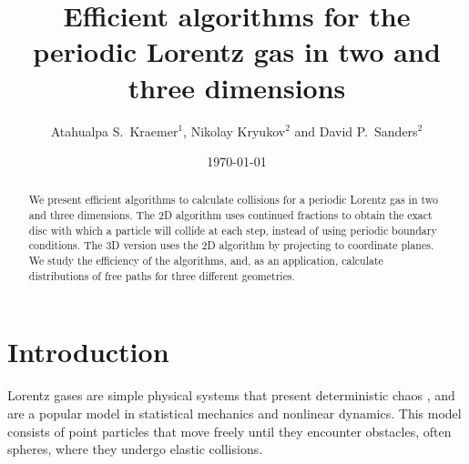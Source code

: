 \documentclass{iopart}
\begin{document}
\title{Efficient algorithms for the periodic Lorentz gas in two and three dimensions}

\author{Atahualpa S.~Kraemer$^{1}$, Nikolay Kryukov$^{2}$ and David P.~Sanders$^{2}$}

\address{$^{1}$ Institut für Theoretische Physik II - Soft Matter
Heinrich-Heine-Universität Düsseldorf
Building 25.32
Room O2.56
Universitätsstrasse 1
D-40225 Düsseldorf, Germany\\
$^{2}$Departamento de F\'isica, Facultad de Ciencias, Universidad Nacional
Aut\'onoma de M\'exico,
Ciudad Universitaria, M\'exico D.F.\ 04510, Mexico
}

 \date{\today}


\begin{abstract}

We present efficient algorithms to calculate collisions for a periodic Lorentz gas in two and three dimensions. The 2D algorithm uses continued fractions to obtain the exact disc with which a particle will collide at each step, instead of using periodic boundary conditions. The 3D version uses the 2D algorithm by projecting to coordinate planes. We study the efficiency of the algorithms, and, as an application, calculate distributions of free paths for three different geometries.
\end{abstract}

\maketitle

\section{Introduction}



Lorentz gases are simple physical systems that present deterministic chaos \cite{cvitanovic1992investigation}, and are a popular model in statistical mechanics and nonlinear dynamics. This model consists of point particles that move freely until they encounter obstacles, often spheres, where they undergo elastic collisions. 
\end{document}
